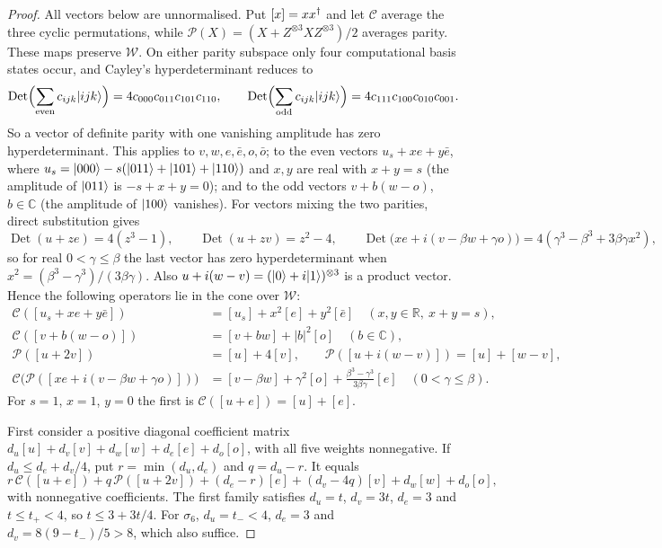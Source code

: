 \begin{proof}
All vectors below are unnormalised. Put $[x]=xx^{\dagger}$ and let $\mathcal C$ average the three cyclic permutations,
while $\mathcal P(X)=(X+Z^{\otimes3}XZ^{\otimes3})/2$ averages parity. These maps preserve $\mathcal W$.
On either parity subspace only four computational basis states occur, and Cayley's hyperdeterminant reduces to
\[
 \operatorname{Det}\Bigl(\sum_{\text{even}}c_{ijk}\lvert ijk\rangle\Bigr)=4c_{000}c_{011}c_{101}c_{110},\qquad
 \operatorname{Det}\Bigl(\sum_{\text{odd}}c_{ijk}\lvert ijk\rangle\Bigr)=4c_{111}c_{100}c_{010}c_{001}.
\]
So a vector of definite parity with one vanishing amplitude has zero hyperdeterminant. This applies to
$v,w,e,\bar e,o,\bar o$; to the even vectors $u_s+xe+y\bar e$, where $u_s=\lvert000\rangle-s(\lvert011\rangle+\lvert101\rangle+\lvert110\rangle)$ and
$x,y$ are real with $x+y=s$ (the amplitude of $\lvert011\rangle$ is $-s+x+y=0$); and to the odd vectors $v+b(w-o)$, $b\in\mathbb C$
(the amplitude of $\lvert100\rangle$ vanishes). For vectors mixing the two parities, direct substitution gives
\[
 \operatorname{Det}(u+ze)=4(z^3-1),\qquad
 \operatorname{Det}(u+zv)=z^2-4,\qquad
 \operatorname{Det}\bigl(xe+i(v-\beta w+\gamma o)\bigr)=4(\gamma^3-\beta^3+3\beta\gamma x^2),
\]
so for real $0<\gamma\le\beta$ the last vector has zero hyperdeterminant when $x^2=(\beta^3-\gamma^3)/(3\beta\gamma)$.
Also $u+i(w-v)=(\lvert0\rangle+i\lvert1\rangle)^{\otimes3}$ is a product vector. Hence the following operators lie in the cone over $\mathcal W$:
\begin{equation}\label{eq:ppt3-w-atoms}
\begin{aligned}
 \mathcal C([u_s+xe+y\bar e])&=[u_s]+x^2[e]+y^2[\bar e]\quad(x,y\in\mathbb R,\ x+y=s),\\
 \mathcal C([v+b(w-o)])&=[v+bw]+|b|^2[o]\quad(b\in\mathbb C),\\
 \mathcal P([u+2v])&=[u]+4[v],\qquad \mathcal P([u+i(w-v)])=[u]+[w-v],\\
 \mathcal C\bigl(\mathcal P([xe+i(v-\beta w+\gamma o)])\bigr)&=[v-\beta w]+\gamma^2[o]+\frac{\beta^3-\gamma^3}{3\beta\gamma}[e]
 \quad(0<\gamma\le\beta).
\end{aligned}
\end{equation}
For $s=1$, $x=1$, $y=0$ the first is $\mathcal C([u+e])=[u]+[e]$.

First consider a positive diagonal coefficient matrix
$d_u[u]+d_v[v]+d_w[w]+d_e[e]+d_o[o]$, with all five weights nonnegative.
If $d_u\le d_e+d_v/4$, put $r=\min(d_u,d_e)$ and $q=d_u-r$. It equals
\[
 r\,\mathcal C([u+e])+q\,\mathcal P([u+2v])
 +(d_e-r)[e]+(d_v-4q)[v]+d_w[w]+d_o[o],
\]
with nonnegative coefficients. The first family satisfies $d_u=t$, $d_v=3t$, $d_e=3$ and $t\le t_+<4$,
so $t\le3+3t/4$. For $\sigma_6$, $d_u=t_-<4$, $d_e=3$ and $d_v=8(9-t_-)/5>8$, which also suffice.


\end{proof}
